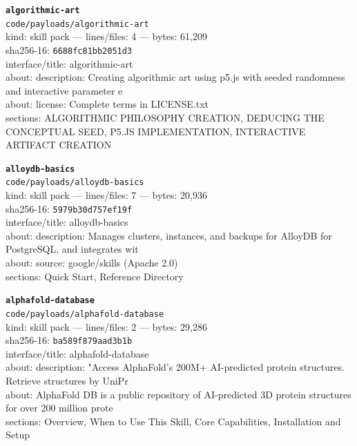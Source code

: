 \noindent\textbf{\texttt{algorithmic-art}}\\
\texttt{code/payloads/algorithmic-art}\\
kind: skill pack --- lines/files: 4 --- bytes: 61,209\\
sha256-16: \texttt{6688fc81bb2051d3}\\
interface/title: algorithmic-art\\
about: description: Creating algorithmic art using p5.js with seeded randomness and interactive parameter e\\
about: license: Complete terms in LICENSE.txt\\
sections: ALGORITHMIC PHILOSOPHY CREATION, DEDUCING THE CONCEPTUAL SEED, P5.JS IMPLEMENTATION, INTERACTIVE ARTIFACT CREATION\\
\vspace*{6.0pt}

\noindent\textbf{\texttt{alloydb-basics}}\\
\texttt{code/payloads/alloydb-basics}\\
kind: skill pack --- lines/files: 7 --- bytes: 20,936\\
sha256-16: \texttt{5979b30d757ef19f}\\
interface/title: alloydb-basics\\
about: description: Manages clusters, instances, and backups for AlloyDB for PostgreSQL, and integrates wit\\
about: source: google/skills (Apache 2.0)\\
sections: Quick Start, Reference Directory\\
\vspace*{6.0pt}

\noindent\textbf{\texttt{alphafold-database}}\\
\texttt{code/payloads/alphafold-database}\\
kind: skill pack --- lines/files: 2 --- bytes: 29,286\\
sha256-16: \texttt{ba589f879aad3b1b}\\
interface/title: alphafold-database\\
about: description: "Access AlphaFold's 200M+ AI-predicted protein structures. Retrieve structures by UniPr\\
about: AlphaFold DB is a public repository of AI-predicted 3D protein structures for over 200 million prote\\
sections: Overview, When to Use This Skill, Core Capabilities, Installation and Setup\\
\vspace*{6.0pt}

